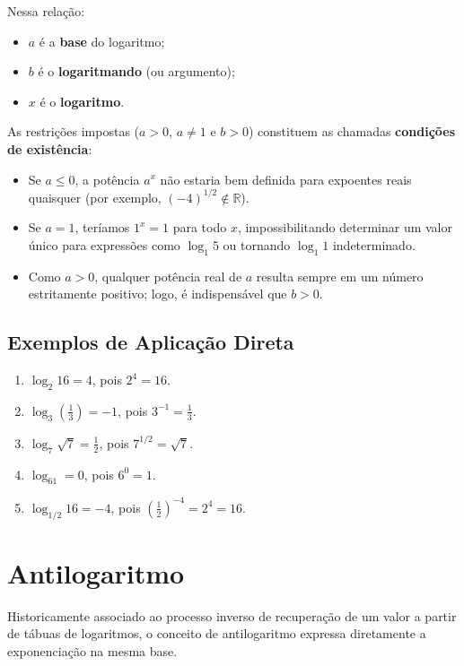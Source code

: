 \documentclass[12pt,a4paper]{report}
\begin{document}
	Nessa relação:
	\begin{itemize}[label=$\circ$]
		\item $a$ é a \textbf{base} do logaritmo;
		\item $b$ é o \textbf{logaritmando} (ou argumento);
		\item $x$ é o \textbf{logaritmo}.
	\end{itemize}
	
	As restrições impostas ($a > 0$, $a \neq 1$ e $b > 0$) constituem as chamadas \textbf{condições de existência}:
	\begin{itemize}[label=$\circ$]
		\item Se $a \leqslant 0$, a potência $a^x$ não estaria bem definida para expoentes reais quaisquer (por exemplo, $(-4)^{1/2} \notin \mathbb{R}$).
		\item Se $a = 1$, teríamos $1^x = 1$ para todo $x$, impossibilitando determinar um valor único para expressões como $\log_1 5$ ou tornando $\log_1 1$ indeterminado.
		\item Como $a > 0$, qualquer potência real de $a$ resulta sempre em um número estritamente positivo; logo, é indispensável que $b > 0$.
	\end{itemize}
	
	\subsection*{Exemplos de Aplicação Direta}
	
	\begin{enumerate}[label=\textbf{\alph*)}]
		\item $\log_2 16 = 4$, pois $2^4 = 16$.
		\item $\log_3 \left(\frac{1}{3}\right) = -1$, pois $3^{-1} = \frac{1}{3}$.
		\item $\log_7 \sqrt{7} = \frac{1}{2}$, pois $7^{1/2} = \sqrt{7}$.
		\item $\log_61 = 0$, pois $6^0 = 1$.
		\item $\log_{1/2} 16 = -4$, pois $\left(\frac{1}{2}\right)^{-4} = 2^4 = 16$.
	\end{enumerate}
	
	\section{Antilogaritmo}
	
	Historicamente associado ao processo inverso de recuperação de um valor a partir de tábuas de logaritmos, o conceito de antilogaritmo expressa diretamente a exponenciação na mesma base.
	
\end{document}
